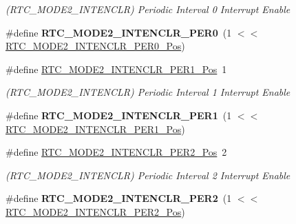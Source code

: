 \begin{DoxyCompactItemize}
\begin{DoxyCompactList}\small\item\em (R\+T\+C\+\_\+\+M\+O\+D\+E2\+\_\+\+I\+N\+T\+E\+N\+C\+L\+R) Periodic Interval 0 Interrupt Enable \end{DoxyCompactList}\item 
\hypertarget{group___s_a_m_l21___r_t_c_ga263200193423e8b8206d0ac95aee4a53}{}\#define {\bfseries R\+T\+C\+\_\+\+M\+O\+D\+E2\+\_\+\+I\+N\+T\+E\+N\+C\+L\+R\+\_\+\+P\+E\+R0}~(1 $<$$<$ \hyperlink{group___s_a_m_l21___r_t_c_ga20f97a744c4263d2f9b77816c200f470}{R\+T\+C\+\_\+\+M\+O\+D\+E2\+\_\+\+I\+N\+T\+E\+N\+C\+L\+R\+\_\+\+P\+E\+R0\+\_\+\+Pos})\label{group___s_a_m_l21___r_t_c_ga263200193423e8b8206d0ac95aee4a53}

\item 
\hypertarget{group___s_a_m_l21___r_t_c_ga4d9ccfbb2ea04431b78955434fa4d384}{}\#define \hyperlink{group___s_a_m_l21___r_t_c_ga4d9ccfbb2ea04431b78955434fa4d384}{R\+T\+C\+\_\+\+M\+O\+D\+E2\+\_\+\+I\+N\+T\+E\+N\+C\+L\+R\+\_\+\+P\+E\+R1\+\_\+\+Pos}~1\label{group___s_a_m_l21___r_t_c_ga4d9ccfbb2ea04431b78955434fa4d384}

\begin{DoxyCompactList}\small\item\em (R\+T\+C\+\_\+\+M\+O\+D\+E2\+\_\+\+I\+N\+T\+E\+N\+C\+L\+R) Periodic Interval 1 Interrupt Enable \end{DoxyCompactList}\item 
\hypertarget{group___s_a_m_l21___r_t_c_ga16da71caf4d4cb66f6fb7a38fb69a7f1}{}\#define {\bfseries R\+T\+C\+\_\+\+M\+O\+D\+E2\+\_\+\+I\+N\+T\+E\+N\+C\+L\+R\+\_\+\+P\+E\+R1}~(1 $<$$<$ \hyperlink{group___s_a_m_l21___r_t_c_ga4d9ccfbb2ea04431b78955434fa4d384}{R\+T\+C\+\_\+\+M\+O\+D\+E2\+\_\+\+I\+N\+T\+E\+N\+C\+L\+R\+\_\+\+P\+E\+R1\+\_\+\+Pos})\label{group___s_a_m_l21___r_t_c_ga16da71caf4d4cb66f6fb7a38fb69a7f1}

\item 
\hypertarget{group___s_a_m_l21___r_t_c_ga1c1c5484f910364525f93f64b549747a}{}\#define \hyperlink{group___s_a_m_l21___r_t_c_ga1c1c5484f910364525f93f64b549747a}{R\+T\+C\+\_\+\+M\+O\+D\+E2\+\_\+\+I\+N\+T\+E\+N\+C\+L\+R\+\_\+\+P\+E\+R2\+\_\+\+Pos}~2\label{group___s_a_m_l21___r_t_c_ga1c1c5484f910364525f93f64b549747a}

\begin{DoxyCompactList}\small\item\em (R\+T\+C\+\_\+\+M\+O\+D\+E2\+\_\+\+I\+N\+T\+E\+N\+C\+L\+R) Periodic Interval 2 Interrupt Enable \end{DoxyCompactList}\item 
\hypertarget{group___s_a_m_l21___r_t_c_ga797e5c71e77100625d601c0305350b66}{}\#define {\bfseries R\+T\+C\+\_\+\+M\+O\+D\+E2\+\_\+\+I\+N\+T\+E\+N\+C\+L\+R\+\_\+\+P\+E\+R2}~(1 $<$$<$ \hyperlink{group___s_a_m_l21___r_t_c_ga1c1c5484f910364525f93f64b549747a}{R\+T\+C\+\_\+\+M\+O\+D\+E2\+\_\+\+I\+N\+T\+E\+N\+C\+L\+R\+\_\+\+P\+E\+R2\+\_\+\+Pos})\label{group___s_a_m_l21___r_t_c_ga797e5c71e77100625d601c0305350b66}


\end{DoxyCompactItemize}

